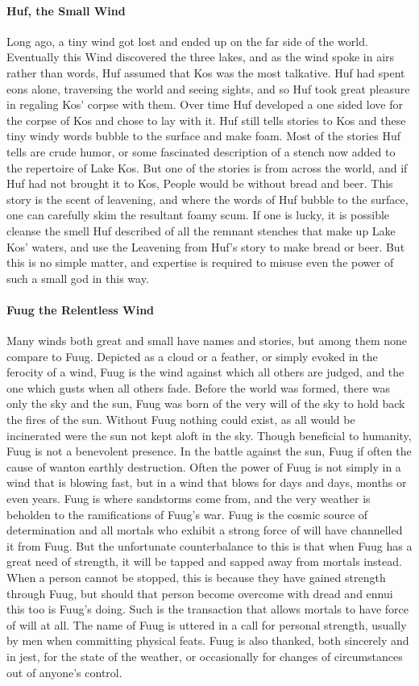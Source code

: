 \paragraph{Huf, the Small Wind}
Long ago, a tiny wind got lost and ended up on the far side of the world. Eventually this Wind discovered the three lakes, and as the wind spoke in airs rather than words, Huf assumed that Kos was the most talkative. Huf had spent eons alone, traversing the world and seeing sights, and so Huf took great pleasure in regaling Kos’ corpse with them. Over time Huf developed a one sided love for the corpse of Kos and chose to lay with it. Huf still tells stories to Kos and these tiny windy words bubble to the surface and make foam. Most of the stories Huf tells are crude humor, or some fascinated description of a stench now added to the repertoire of Lake Kos. But one of the stories is from across the world, and if Huf had not brought it to Kos, People would be without bread and beer. This story is the scent of leavening, and where the words of Huf bubble to the surface, one can carefully skim the resultant foamy scum. If one is lucky, it is possible cleanse the smell Huf described of all the remnant stenches that make up Lake Kos’ waters, and use the Leavening from Huf’s story to make bread or beer. But this is no simple matter, and expertise is required to misuse even the power of such a small god in this way.

\paragraph{Fuug the Relentless Wind}
Many winds both great and small have names and stories, but among them none compare to Fuug. Depicted as a cloud or a feather, or simply evoked in the ferocity of a wind, Fuug is the wind against which all others are judged, and the one which gusts when all others fade. Before the world was formed, there was only the sky and the sun, Fuug was born of the very will of the sky to hold back the fires of the sun. Without Fuug nothing could exist, as all would be incinerated were the sun not kept aloft in the sky. Though beneficial to humanity, Fuug is not a benevolent presence. In the battle against the sun, Fuug if often the cause of wanton earthly destruction. Often the power of Fuug is not simply in a wind that is blowing fast, but in a wind that blows for days and days, months or even years. Fuug is where sandstorms come from, and the very weather is beholden to the ramifications of Fuug’s war. Fuug is the cosmic source of determination and all mortals who exhibit a strong force of will have channelled it from Fuug. But the unfortunate counterbalance to this is that when Fuug has a great need of strength, it will be tapped and sapped away from mortals instead. When a person cannot be stopped, this is because they have gained strength through Fuug, but should that person become overcome with dread and ennui this too is Fuug’s doing. Such is the transaction that allows mortals to have force of will at all. The name of Fuug is uttered in a call for personal strength, usually by men when committing physical feats. Fuug is also thanked, both sincerely and in jest, for the state of the weather, or occasionally for changes of circumstances out of anyone’s control.

